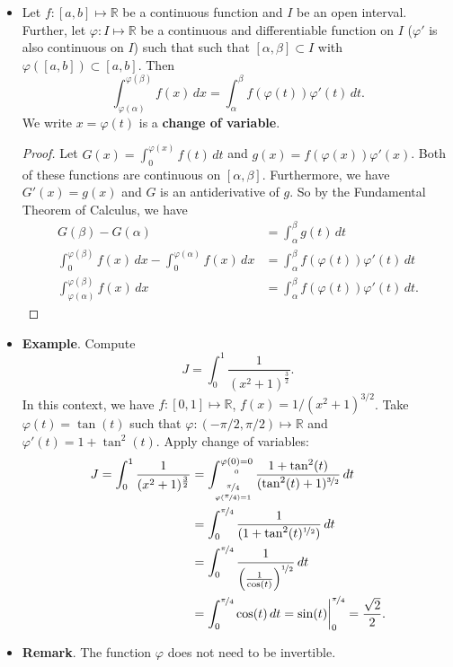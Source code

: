 \documentclass{article}
\newcommand{\R}{\mathbb{R}}
\newcommand{\?}{\stackrel{?}{=}}
\theoremstyle{definition} %
\begin{document}
\begin{itemize}
    \item[]
    \begin{lemma}
        Let $f: [a, b] \mapsto \R$ be a continuous function and $I$ be an open interval. Further, let $\varphi: I \mapsto \R$ be a continuous and differentiable function on $I$ ($\varphi'$ is also continuous on $I$) such that such that $[\alpha, \beta] \subset I$ with $\varphi([a, b]) \subset [a, b]$. Then
        $$\int_{\varphi(\alpha)}^{\varphi(\beta)} f(x) \,dx = \int_\alpha^\beta f(\varphi(t))\varphi'(t) \,dt.$$
        We write $x = \varphi(t)$ is a \textbf{change of variable}.
        \label{lemma:change_of_var}
    \end{lemma}
    \begin{proof}
        Let $G(x) = \int_0^{\varphi(x)} f(t) \,dt$ and $g(x) = f(\varphi(x))\varphi'(x)$. Both of these functions are continuous on $[\alpha, \beta]$. Furthermore, we have $G'(x) = g(x)$ and $G$ is an antiderivative of $g$. So by the Fundamental Theorem of Calculus, we have
        \begin{align*}
            G(\beta) - G(\alpha) &= \int_{\alpha}^\beta g(t) \,dt \\
            \int_{0}^{\varphi(\beta)} f(x) \,dx - \int_0^{\varphi(\alpha)} f(x) \,dx &= \int_\alpha^\beta f(\varphi(t))\varphi'(t) \,dt \\
            \int_{\varphi(\alpha)}^{\varphi(\beta)} f(x) \,dx &= \int_\alpha^\beta f(\varphi(t))\varphi'(t) \,dt.
        \end{align*}
    \end{proof}
    \item \textbf{Example}. Compute
        $$J = \int_0^1 \frac{1}{(x^2 + 1)^{\frac{3}{2}}}.$$
        In this context, we have $f: [0, 1] \mapsto \R$, $f(x) = 1/(x^2 + 1)^{3/2}$. Take $\varphi(t) = \tan(t)$ such that $\varphi: (-\pi/2, \pi/2) \mapsto \R$ and $\varphi'(t) = 1 + \tan^2(t)$. Apply change of variables:
        \begin{align*}
            J = \int_0^1 \frac{1}{(x^2 + 1)^{\frac{3}{2}}} &= \int_{\underset{\varphi(\nicefrac{\pi}{4}) = 1}{\nicefrac{\pi}{4}}}^{\underset{0}{\varphi(0) = 0}} \frac{1 + \tan^2(t)}{(\tan^2(t) + 1)^{\nicefrac{3}{2}}} \,dt \\
            &= \int_0^{\nicefrac{\pi}{4}} \frac{1}{(1 + \tan^2(t)^{\nicefrac{1}{2}})} \,dt \\
            &= \int_0^{\nicefrac{\pi}{4}} \frac{1}{\left(\frac{1}{\cos(t)}\right)^{\nicefrac{1}{2}}} \,dt \\
            &= \int_0^{\nicefrac{\pi}{4}} \cos(t) \,dt = \sin(t) \bigg|_0^{\nicefrac{\pi}{4}} = \frac{\sqrt{2}}{2}.
        \end{align*}
    \item \textbf{Remark}. The function $\varphi$ does not need to be invertible.
\end{itemize}
\end{document}
